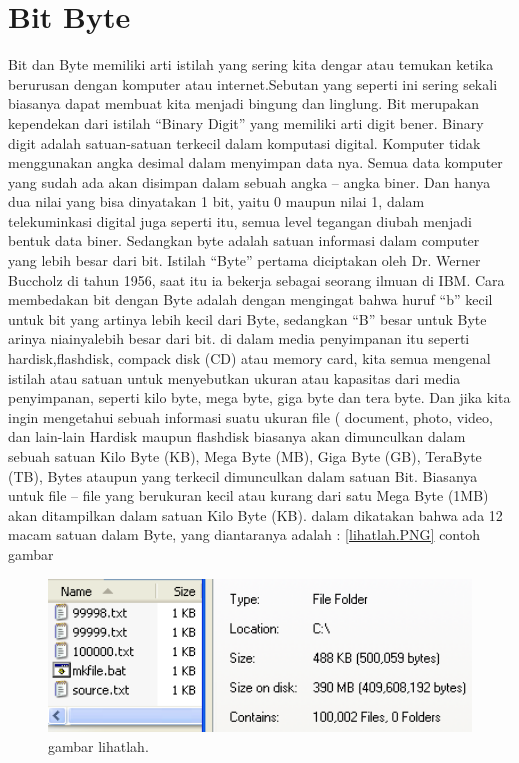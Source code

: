 ﻿%

\section {Bit Byte}
Bit dan Byte memiliki arti istilah yang sering kita dengar atau temukan ketika berurusan dengan komputer atau internet.Sebutan yang seperti ini sering sekali biasanya dapat membuat kita menjadi bingung dan linglung. Bit merupakan kependekan dari istilah “Binary Digit” yang memiliki arti digit bener.
Binary digit adalah satuan-satuan terkecil dalam komputasi digital. Komputer tidak menggunakan angka desimal  dalam menyimpan data nya. Semua data komputer yang sudah ada akan disimpan dalam sebuah angka – angka biner. Dan hanya dua nilai yang bisa dinyatakan 1 bit, yaitu 0 maupun nilai 1, dalam telekuminkasi digital juga seperti itu, semua level tegangan diubah menjadi bentuk data biner.
Sedangkan byte adalah satuan informasi dalam computer yang lebih besar dari bit. Istilah “Byte” pertama diciptakan oleh Dr. Werner Buccholz di tahun 1956, saat itu ia bekerja sebagai seorang ilmuan di IBM. 
Cara membedakan bit dengan Byte adalah dengan mengingat bahwa  huruf “b” kecil untuk bit yang artinya lebih kecil dari Byte, sedangkan “B” besar untuk Byte arinya niainyalebih besar dari bit.
di dalam media penyimpanan itu seperti hardisk,flashdisk, compack disk (CD) atau memory card, kita semua mengenal istilah atau satuan untuk menyebutkan ukuran atau kapasitas dari media penyimpanan, seperti kilo byte, mega byte, giga byte dan tera byte. Dan jika kita ingin mengetahui sebuah informasi suatu ukuran file ( document, photo, video, dan lain-lain
Hardisk maupun flashdisk biasanya akan dimunculkan dalam sebuah satuan Kilo Byte (KB), Mega Byte (MB), Giga Byte (GB), TeraByte (TB), Bytes ataupun yang terkecil dimunculkan dalam satuan Bit. Biasanya untuk file – file yang berukuran kecil atau kurang dari satu Mega Byte (1MB) akan ditampilkan dalam satuan Kilo Byte (KB).
dalam \cite{tucker2012bit} dikatakan bahwa ada 12 macam satuan dalam Byte, yang diantaranya adalah :
\ref{lihatlah.PNG}
contoh gambar

\begin{figure}[ht]
\centerline{\includegraphics[width=1\textwidth]{figures/lihatlah.png}}
\caption{gambar lihatlah.}
\label{lihatlah.png}
\end{figure}

